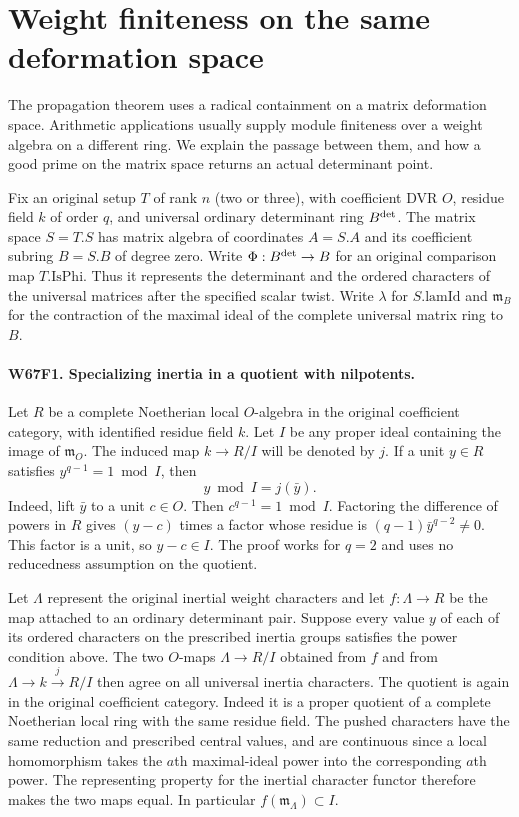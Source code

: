 \section{Weight finiteness on the same deformation space}

The propagation theorem uses a radical containment on a matrix
deformation space. Arithmetic applications usually supply module
finiteness over a weight algebra on a different ring. We explain the
passage between them, and how a good prime on the matrix space
returns an actual determinant point.

Fix an original setup $T$ of rank $n$ (two or three), with coefficient
DVR $O$, residue field $k$ of order $q$, and universal ordinary
determinant ring $B^{\rm det}$. The matrix space $S=T.S$ has
matrix algebra of coordinates $A=S.A$ and its coefficient subring
$B=S.B$ of degree zero. Write $\Phi:B^{\rm det}\to B$ for an
original comparison map $T.\mathrm{IsPhi}$. Thus it represents the
determinant and the ordered characters of the universal matrices
after the specified scalar twist. Write $\lambda$ for $S.\mathrm{lamId}$
and $\mathfrak m_B$ for the contraction of the maximal ideal of
the complete universal matrix ring to $B$.

\paragraph{W67F1. Specializing inertia in a quotient with nilpotents.}
Let $R$ be a complete Noetherian local $O$-algebra in the original
coefficient category, with identified residue field $k$. Let $I$
be any proper ideal containing the image of $\mathfrak m_O$. The
induced map $k\to R/I$ will be denoted by $j$. If a unit $y\in R$
satisfies $y^{q-1}=1\bmod I$, then
\[
                         y\bmod I=j(\bar y).
\]
Indeed, lift $\bar y$ to a unit $c\in O$. Then $c^{q-1}=1\bmod I$.
Factoring the difference of powers in $R$ gives $(y-c)$ times a
factor whose residue is $(q-1)\bar y^{q-2}\ne0$. This factor is
a unit, so $y-c\in I$. The proof works for $q=2$ and uses no
reducedness assumption on the quotient.

Let $\Lambda$ represent the original inertial weight characters
and let $f:\Lambda\to R$ be the map attached to an ordinary
determinant pair. Suppose every value $y$ of each of its ordered
characters on the prescribed inertia groups satisfies the power
condition above. The two $O$-maps $\Lambda\to R/I$ obtained from
$f$ and from $\Lambda\to k\xrightarrow{j}R/I$ then agree on all
universal inertia characters. The quotient is again in the original
coefficient category. Indeed it is a proper quotient of a complete
Noetherian local ring with the same residue field. The pushed
characters have the same reduction and prescribed central values,
and are continuous since a local homomorphism takes the $a$th
maximal-ideal power into the corresponding $a$th power.
The representing property for the inertial character functor
therefore makes the two maps equal. In particular
$f(\mathfrak m_\Lambda)\subset I$.

